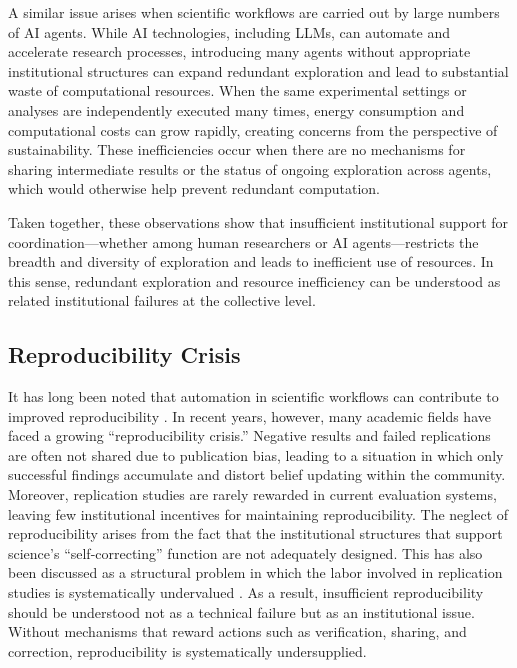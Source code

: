 \documentclass[sigconf]{aamas}
\begin{document}
A similar issue arises when scientific workflows are carried out by large numbers of AI agents. While AI technologies, including LLMs, can automate and accelerate research processes, introducing many agents without appropriate institutional structures can expand redundant exploration and lead to substantial waste of computational resources. When the same experimental settings or analyses are independently executed many times, energy consumption and computational costs can grow rapidly, creating concerns from the perspective of sustainability. These inefficiencies occur when there are no mechanisms for sharing intermediate results or the status of ongoing exploration across agents, which would otherwise help prevent redundant computation.

Taken together, these observations show that insufficient institutional support for coordination—whether among human researchers or AI agents—restricts the breadth and diversity of exploration and leads to inefficient use of resources. In this sense, redundant exploration and resource inefficiency can be understood as related institutional failures at the collective level.


\subsection{Reproducibility Crisis}

It has long been noted that automation in scientific workflows can contribute to improved reproducibility \cite{King2009Automation}. In recent years, however, many academic fields have faced a growing “reproducibility crisis.” Negative results and failed replications are often not shared due to publication bias, leading to a situation in which only successful findings accumulate and distort belief updating within the community. Moreover, replication studies are rarely rewarded in current evaluation systems, leaving few institutional incentives for maintaining reproducibility.
The neglect of reproducibility arises from the fact that the institutional structures that support science’s ``self-correcting'' function are not adequately designed. This has also been discussed as a structural problem in which the labor involved in replication studies is systematically undervalued \cite{romero2020division}. As a result, insufficient reproducibility should be understood not as a technical failure but as an institutional issue. Without mechanisms that reward actions such as verification, sharing, and correction, reproducibility is systematically undersupplied.
\end{document}
